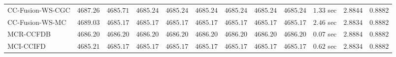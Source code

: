 \begin{table}[H]
\begin{tabular}{lrrrrrrrrrrr}
    CC-Fusion-WS-CGC & $      4687.26$ & $      4685.71$ & $      4685.24$ & $      4685.24$ & $      4685.24$ & $      4685.24$ & $      4685.24$ & $      4685.24$ & $         1.33$ sec    & $       2.8844$  & $       0.8882$ \\ 
     CC-Fusion-WS-MC & $      4689.03$ & $      4685.17$ & $      4685.17$ & $      4685.17$ & $      4685.17$ & $      4685.17$ & $      4685.17$ & $      4685.17$ & $         2.46$ sec    & $       2.8834$  & $       0.8882$ \\ 
\cmidrule{1-1} 
           MCR-CCFDB & $      4686.20$ & $      4686.20$ & $      4686.20$ & $      4686.20$ & $      4686.20$ & $      4686.20$ & $      4686.20$ & $      4686.20$ & $         0.07$ sec    & $       2.8884$  & $       0.8882$ \\ 
\cmidrule{1-1} 
           MCI-CCIFD & $      4685.21$ & $      4685.17$ & $      4685.17$ & $      4685.17$ & $      4685.17$ & $      4685.17$ & $      4685.17$ & $      4685.17$ & $         0.62$ sec    & $       2.8834$  & $       0.8882$ \\ 
\bottomrule
\end{tabular}
\end{table}

